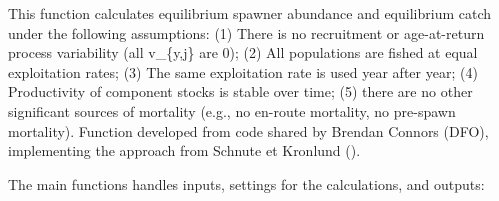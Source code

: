 \documentclass[french,11pt]{book}
\newenvironment{Shaded}{\begin{snugshade}}{\end{snugshade}}
\newcommand{\AttributeTok}[1]{\textcolor[rgb]{0.77,0.63,0.00}{#1}}
\newcommand{\CommentTok}[1]{\textcolor[rgb]{0.56,0.35,0.01}{\textbf{#1}}}
\newcommand{\ControlFlowTok}[1]{\textcolor[rgb]{0.13,0.29,0.53}{\textit{#1}}}
\newcommand{\DecValTok}[1]{\textcolor[rgb]{0.00,0.00,0.81}{#1}}
\newcommand{\FloatTok}[1]{\textcolor[rgb]{0.00,0.00,0.81}{#1}}
\newcommand{\FunctionTok}[1]{\textcolor[rgb]{0.00,0.00,0.00}{#1}}
\newcommand{\NormalTok}[1]{#1}
\newcommand{\OtherTok}[1]{\textcolor[rgb]{0.56,0.35,0.01}{#1}}
\newcommand{\SpecialCharTok}[1]{\textcolor[rgb]{0.00,0.00,0.00}{#1}}
\newcommand{\StringTok}[1]{\textcolor[rgb]{0.31,0.60,0.02}{#1}}
\begin{document}
This function calculates equilibrium spawner abundance and equilibrium catch under the following assumptions: (1) There is no recruitment or age-at-return process variability (all v\_\{y,j\} are 0); (2) All populations are fished at equal exploitation rates; (3) The same exploitation rate is used year after year; (4) Productivity of component stocks is stable over time; (5) there are no other significant sources of mortality (e.g., no en-route mortality, no pre-spawn mortality). Function developed from code shared by Brendan Connors (DFO), implementing the approach from Schnute et Kronlund ().

The main functions handles inputs, settings for the calculations, and outputs:
\begin{Shaded}
\end{Shaded}
\end{document}
